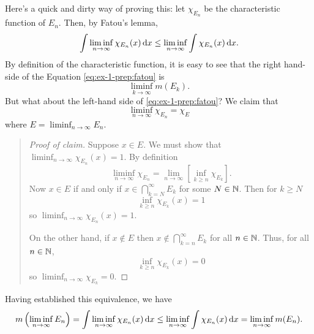 \begin{solution}
  Here's a quick and dirty way of proving this: let $\chi_{E_n}$ be the
  characteristic function of $E_n$. Then, by Fatou's lemma,
  \begin{equation}
    \label{eq:ex-1-prep:fatou}
    \int\liminf_{n\to\infty}\chi_{E_n}(x)\mathop{}\!\mathrm{d} x
    \leq\liminf_{n\to\infty}\int\chi_{E_n}(x)\mathop{}\!\mathrm{d} x.
  \end{equation}
  By definition of the characteristic function, it is easy to see that the
  right hand-side of the Equation \eqref{eq:ex-1-prep:fatou} is
  \[
    \liminf_{k\to\infty}m(E_k).
  \]
  But what about the left-hand side of \eqref{eq:ex-1-prep:fatou}? We claim
  that
  \[
    \liminf_{n\to\infty}\chi_{E_n}=\chi_{E}
  \]
  where $E=\liminf_{n\to\infty} E_n$.
  \begin{quote}
    \begin{proof}[Proof of claim]
      Suppose $x\in E$. We must show that
      $\liminf_{n\to\infty}\chi_{E_n}(x)=1$. By definition
      \[
        \liminf_{n\to\infty}\chi_{E_n}=%
        \lim_{n\to\infty}\left[\inf_{k\geq n}\chi_{E_k}\right].
      \]
      Now $x\in E$ if and only if $x\in \bigcap_{k=N}^\infty E_k$ for some
      $N\in\mathbb{N}$. Then for $k\geq N$
      \[
        \inf_{k\geq n}\chi_{E_k}(x)=1
      \]
      so $\liminf_{n\to\infty}\chi_{E_n}(x)=1$.

      On the other hand, if $x\notin E$ then $x\notin\bigcap_{k=n}^\infty
      E_k$ for all $n\in\mathbb{N}$. Thus, for all $n\in\mathbb{N}$,
      \[
        \inf_{k\geq n}\chi_{E_k}(x)=0
      \]
      so $\liminf_{n\to\infty}\chi_{E_k}=0$.
    \end{proof}
  \end{quote}
  Having established this equivalence, we have
  \[
    m\left(\liminf_{n\to\infty}E_n\right)=%
    \int\liminf_{n\to\infty}\chi_{E_n}(x)\diff x\leq%
    \liminf_{n\to\infty}\int\chi_{E_n}(x)\diff x=%
    \liminf_{n\to\infty}m(E_n).
  \]
\end{solution}

